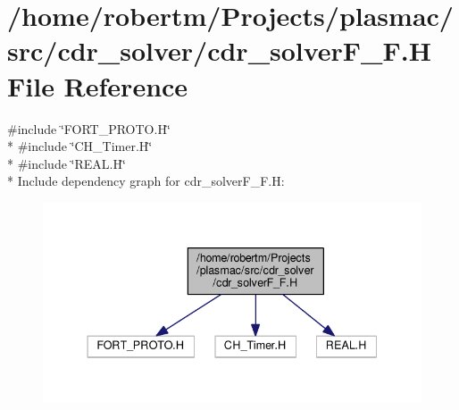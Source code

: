\hypertarget{cdr__solverF__F_8H}{}\section{/home/robertm/\+Projects/plasmac/src/cdr\+\_\+solver/cdr\+\_\+solver\+F\+\_\+F.H File Reference}
\label{cdr__solverF__F_8H}
{\ttfamily \#include \char`\"{}F\+O\+R\+T\+\_\+\+P\+R\+O\+T\+O.\+H\char`\"{}}\\*
{\ttfamily \#include \char`\"{}C\+H\+\_\+\+Timer.\+H\char`\"{}}\\*
{\ttfamily \#include \char`\"{}R\+E\+A\+L.\+H\char`\"{}}\\*
Include dependency graph for cdr\+\_\+solver\+F\+\_\+\+F.\+H\+:\nopagebreak
\begin{figure}[H]
\begin{center}
\leavevmode
\includegraphics[width=337pt]{cdr__solverF__F_8H__incl}
\end{center}
\end{figure}
